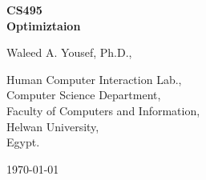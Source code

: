 \begin{titlingpage}
  \begin{center}
    \vspace*{1in}

    \textbf{\large CS495\\ Optimiztaion}

    \vspace*{1in}

    Waleed A. Yousef, Ph.D.,

    \bigskip

    Human Computer Interaction Lab.,\\Computer Science Department,\\Faculty of Computers and
    Information,\\Helwan University,\\Egypt.

    \bigskip

    \today

  \end{center}
\end{titlingpage}

\clearpage

